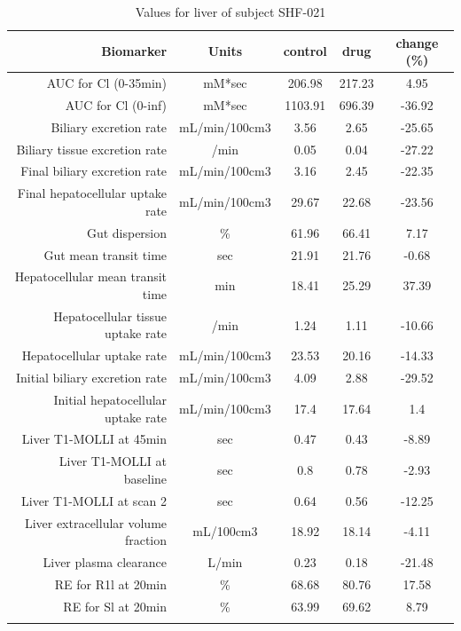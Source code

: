 \documentclass{epflreport}%
\begin{document}
%
\clearpage%
\begin{longtable}{rcccc}%
\hline%
Biomarker&Units&control&drug&change (\%)\\%
\hline%
AUC for Cl (0{-}35min)&mM*sec&206.98&217.23&4.95\\%
AUC for Cl (0{-}inf)&mM*sec&1103.91&696.39&{-}36.92\\%
Biliary excretion rate&mL/min/100cm3&3.56&2.65&{-}25.65\\%
Biliary tissue excretion rate&/min&0.05&0.04&{-}27.22\\%
Final biliary excretion rate&mL/min/100cm3&3.16&2.45&{-}22.35\\%
Final hepatocellular uptake rate&mL/min/100cm3&29.67&22.68&{-}23.56\\%
Gut dispersion&\%&61.96&66.41&7.17\\%
Gut mean transit time&sec&21.91&21.76&{-}0.68\\%
Hepatocellular mean transit time&min&18.41&25.29&37.39\\%
Hepatocellular tissue uptake rate&/min&1.24&1.11&{-}10.66\\%
Hepatocellular uptake rate&mL/min/100cm3&23.53&20.16&{-}14.33\\%
Initial biliary excretion rate&mL/min/100cm3&4.09&2.88&{-}29.52\\%
Initial hepatocellular uptake rate&mL/min/100cm3&17.4&17.64&1.4\\%
Liver T1{-}MOLLI at 45min&sec&0.47&0.43&{-}8.89\\%
Liver T1{-}MOLLI at baseline&sec&0.8&0.78&{-}2.93\\%
Liver T1{-}MOLLI at scan 2&sec&0.64&0.56&{-}12.25\\%
Liver extracellular volume fraction&mL/100cm3&18.92&18.14&{-}4.11\\%
Liver plasma clearance&L/min&0.23&0.18&{-}21.48\\%
RE for R1l at 20min&\%&68.68&80.76&17.58\\%
RE for Sl at 20min&\%&63.99&69.62&8.79\\%
\hline%
\caption{Values for liver of subject SHF-021} \\%
\end{longtable}%
\end{document}
